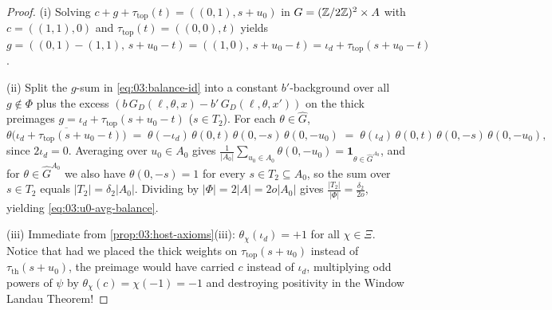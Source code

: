 \begin{proof}
(i) Solving $c + g + \tau_{\mathrm{top}}(t) = ((0, 1), s + u_0)$ in $G = (\mathbb{Z}/2\mathbb{Z})^2 \times A$ with $c = ((1, 1), 0)$ and $\tau_{\mathrm{top}}(t) = ((0, 0), t)$ yields $g = ((0, 1) - (1, 1),\, s + u_0 - t) = ((1, 0),\, s + u_0 - t) = \iota_d + \tau_{\mathrm{top}}(s + u_0 - t)$.

(ii) Split the $g$-sum in \eqref{eq:03:balance-id} into a constant $b'$-background over all $g \notin \Phi$ plus the excess $(b\,G_D(\ell, \theta, x) - b'\,G_D(\ell, \theta, x'))$ on the thick preimages $g = \iota_d + \tau_{\mathrm{top}}(s + u_0 - t)$ ($s \in T_2$). For each $\theta \in \widehat{G}$,
\[
  \overline{\theta\bigl(\iota_d + \tau_{\mathrm{top}}(s + u_0 - t)\bigr)}
  \;=\; \theta(-\iota_d)\,\theta(0, t)\,\theta(0, -s)\,\theta(0, -u_0)
  \;=\; \theta(\iota_d)\,\theta(0, t)\,\theta(0, -s)\,\theta(0, -u_0),
\]
since $2\iota_d = 0$. Averaging over $u_0 \in A_0$ gives $\frac{1}{|A_0|}\sum_{u_0 \in A_0} \theta(0, -u_0) = \mathbf{1}_{\theta \in \widehat{G}^{A_0}}$, and for $\theta \in \widehat{G}^{A_0}$ we also have $\theta(0, -s) = 1$ for every $s \in T_2 \subseteq A_0$, so the sum over $s \in T_2$ equals $|T_2| = \delta_2 |A_0|$. Dividing by $|\Phi| = 2|A| = 2o|A_0|$ gives $\frac{|T_2|}{|\Phi|} = \frac{\delta_2}{2o}$, yielding \eqref{eq:03:u0-avg-balance}.

(iii) Immediate from \cref{prop:03:host-axioms}(iii): $\theta_\chi(\iota_d) = +1$ for all $\chi \in \Xi$. Notice that had we placed the thick weights on $\tau_{\mathrm{top}}(s+u_0)$ instead of $\tau_{\mathrm{th}}(s+u_0)$, the preimage would have carried $c$ instead of $\iota_d$, multiplying odd powers of $\psi$ by $\theta_\chi(c) = \chi(-1) = -1$ and destroying positivity in the Window Landau Theorem!
\end{proof}

